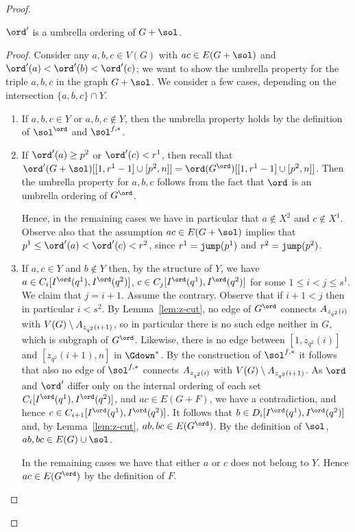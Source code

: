 \begin{proof}
\begin{claim}\label{cl:layer-two:umbrella}
$\ord'$ is a umbrella ordering of $G+\sol$.
\end{claim}
\begin{proof}
Consider any $a,b,c \in V(G)$ with $ac \in E(G+\sol)$ and
$\ord'(a) < \ord'(b) < \ord'(c)$; we want to show the umbrella property for the triple
$a,b,c$ in the graph $G+\sol$. We consider a few cases, depending on the intersection $\{a,b,c\} \cap Y$.
\begin{enumerate}
\item If $a,b,c \in Y$ or $a,b,c \notin Y$, then the umbrella property holds by the definition of $\sol^\ord$ and $\sol^{f,\ast}$.
\item If $\ord'(a) \geq p^2$ or $\ord'(c) < r^1$, then recall that $\ord'(G+\sol)[[1,r^1-1]\cup[p^2,n]] = \ord(G^\ord)[[1,r^1-1]\cup[p^2,n]]$. Then the umbrella property for $a,b,c$ follows from the fact that $\ord$ is an umbrella ordering of $G^\ord$.

Hence, in the remaining cases we have in particular that $a\notin X^2$ and $c\notin X^1$. Observe also that the assumption $ac \in E(G+\sol)$ implies that $p^1 \leq \ord'(a) < \ord'(c) < r^2$, since $r^1=\mathtt{jump}(p^1)$ and $r^2=\mathtt{jump}(p^2)$.

\item If $a,c \in Y$ and $b \notin Y$ then, by the structure of $Y$, we have $a \in C_i[I^\ord(q^1),I^\ord(q^2)]$, $c \in C_j[I^\ord(q^1),I^\ord(q^2)]$ for some $1 \leq i < j \leq s^1$. We claim that $j = i+1$. Assume the contrary. Observe that if $i+1 < j$ then in particular $i < s^2$.
By Lemma~\ref{lem:z-cut}, no edge of $G^\ord$ connects $A_{z_{q^2}(i)}$ with $V(G) \setminus A_{z_{q^2}(i+1)}$, so in particular there is no such edge neither in $G$, which is subgraph of $G^\ord$. Likewise, there is no edge between $[1,z_{q^2}(i)]$ and $[z_{q^2}(i+1),n]$ in $\Gdown^\ast$. By the construction of $\sol^{f,\ast}$ it follows that also no edge of $\sol^{f,\ast}$ connects $A_{z_{q^2}(i)}$ with $V(G) \setminus A_{z_{q^2}(i+1)}$.
As $\ord$ and $\ord'$ differ only on the internal ordering of each set $C_i[I^\ord(q^1),I^\ord(q^2)]$, and $ac\in E(G+F)$, we have a contradiction,
and hence $c \in C_{i+1}[I^\ord(q^1),I^\ord(q^2)]$.
It follows that $b \in D_i[I^\ord(q^1),I^\ord(q^2)]$ and, by Lemma~\ref{lem:z-cut}, $ab,bc \in E(G^\ord)$.
  By the definition of $\sol$, $ab,bc \in E(G)\cup \sol$.

In the remaining cases we have that either $a$ or $c$ does not belong to $Y$. Hence $ac\in E(G^\ord)$ by the definition of $F$.


\end{enumerate}
\end{proof}
\end{proof}
